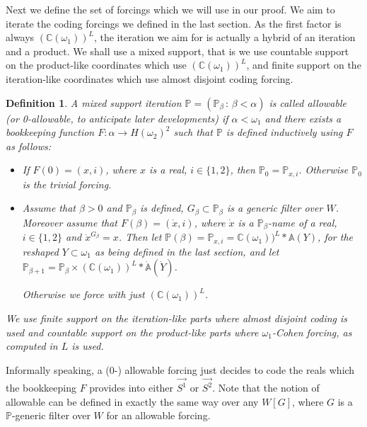 \documentclass[a4paper,11pt]{article}
\newtheorem{definition}[theorem]{Definition}
\newcommand{\forceP}{\mathbb{P}}
\begin{document}
Next we define the set of forcings which we will use in our proof.
We aim to iterate the coding forcings we defined in the last section. As the first factor is always $(\mathbb{C}(\omega_1))^L$, the iteration we aim for is actually a hybrid of an iteration and a product. We shall use a mixed support, that is we use countable support on the  product-like coordinates which use $(\mathbb{C}(\omega_1))^L$, and finite support on the iteration-like coordinates which use almost disjoint coding forcing.
\begin{definition}
A mixed support iteration $\forceP=(\forceP_{\beta}\,:\, {\beta< \alpha})$ is called allowable (or 0-allowable, to anticipate later developments) if $\alpha < \omega_1$ and there exists a bookkeeping function $F: \alpha \rightarrow H(\omega_2)^2$ such that 
 $\forceP$ is defined inductively using $F$ as follows:
 \begin{itemize}
 \item If $F(0)=(x,i)$, where $x$ is a real, $i\in \{1,2\}$, then $\forceP_0= \forceP_{x,i}$. Otherwise $\forceP_0$ is the trivial forcing.
 \item Assume that $\beta>0$ and $\forceP_{\beta}$ is defined, $G_{\beta} \subset \forceP_{\beta}$ is a generic filter over $W$. Moreover assume that $F(\beta)=(\dot{x}, i)$, where $\dot{x}$ is a $\forceP_{\beta}$-name of a real, $i \in \{1,2\}$ and $\dot{x}^{G_{\beta}}=x$. Then let $\forceP (\beta)= \forceP_{x,i}= \mathbb{C}(\omega_1))^L \ast {\mathbb{A}} (Y) $, for the reshaped $Y\subset \omega_1$ as being defined in the last section, and let $\forceP_{\beta+1}= \forceP_{\beta} \times (\mathbb{C} (\omega_1))^L \ast \dot{\mathbb{A}} (\dot{Y} )$.

Otherwise we force with just $(\mathbb{C} (\omega_1))^L$.
 \end{itemize}
 We use finite support on the iteration-like parts where almost disjoint coding is used and countable support on the product-like parts where $\omega_1$-Cohen forcing, as computed in $L$ is used.

 
\end{definition}
 Informally speaking, a (0-) allowable forcing just decides to code the reals which the bookkeeping $F$ provides into either $\vec{S^1}$ or $\vec{S^2}$. Note that the notion of allowable can be defined in exactly the same way over any $W[G]$, where $G$ is a $\forceP$-generic filter over $W$ for an allowable forcing.
\end{document}

